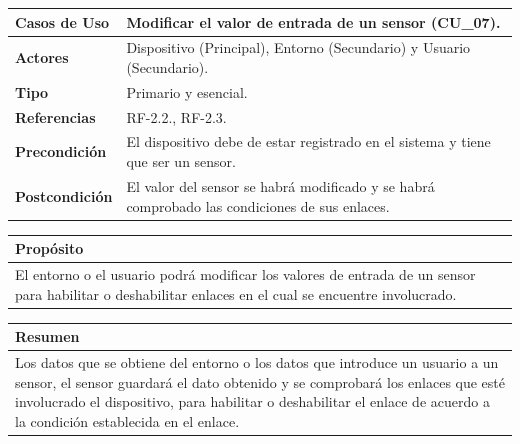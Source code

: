\begin{itemize}
    \begin{table}[h!]
        \centering
        \begin{tabular}{|l|p{}|}
            \hline
            \textbf{Casos de Uso}   &   Modificar el valor de entrada de un sensor (CU\_07). \\
            \hline 
            \textbf{Actores}        &   Dispositivo (Principal), Entorno (Secundario) y Usuario (Secundario). \\ 
            \hline 
            \textbf{Tipo}           &   Primario y esencial. \\ 
            \hline
            \textbf{Referencias}    &   RF-2.2., RF-2.3. \\ 
            \hline
            \textbf{Precondición}   &   El dispositivo debe de estar registrado en el sistema y tiene que ser un sensor. \\ 
            \hline
            \textbf{Postcondición}  &   El valor del sensor se habrá modificado y se habrá comprobado las condiciones de 
            sus enlaces. \\ 
            \hline
        \end{tabular}
        
        \vspace{5mm}
        
        \begin{tabular}{|p{\textwidth}|}
            \hline
            \rowcolor{SeaGreen} \textbf{Propósito} \\
            \hline
            \multicolumn{1}{|p{12cm}|}{El entorno o el usuario podrá modificar los valores de entrada de un sensor para 
            habilitar o deshabilitar enlaces en el cual se encuentre involucrado.} \\ [0.5ex]
            \hline
        \end{tabular}
        
        \vspace{5mm}
        
        \begin{tabular}{|p{\textwidth}|}
            \hline
            \rowcolor{SeaGreen} \textbf{Resumen} \\
            \hline
            \multicolumn{1}{|p{12cm}|}{Los datos que se obtiene del entorno o los datos que introduce un usuario a un 
            sensor, el sensor guardará el dato obtenido y se comprobará los enlaces que esté involucrado el dispositivo, 
            para habilitar o deshabilitar el enlace de acuerdo a la condición establecida en el enlace.} \\ [0.5ex]
            \hline
        \end{tabular}
        

\end{table}
\end{itemize}
